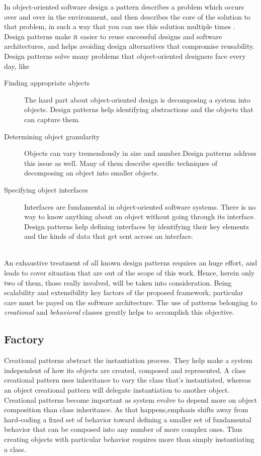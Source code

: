 In object-oriented software design a pattern describes a problem which occurs over and over in the environment, and then describes the core of the solution to that problem, in such a way that you can use this solution multiple times \citep{vlissides1995design}. Design patterns make it easier to reuse successful designs and software architectures, and helps avoiding design alternatives that compromise reusability.
\noindent
\\
Design patterns solve many problems that object-oriented designers face every day, like
\begin{description}
\item[Finding appropriate abjects] The hard part about object-oriented design is decomposing a system into objects. Design patterns help identifying abstractions and the objects that can capture them.
\item[Determining object granularity] Objects can vary tremendously in size and number.Design patterns address this issue as well. Many of them describe specific techniques of decomposing an object into smaller objects.
\item[Specifying object interfaces] Interfaces are fundamental in object-oriented software systems. There is no way to know anything about an object without going through its interface. Design patterns help defining interfaces by identifying their key elements and the kinds of data that get sent across an interface.
\end{description}
\noindent
\\
An exhaustive treatment of all known design patterns requires an huge effort, and leads to cover situation that are out of the scope of this work. Hence, herein only two of them, those really involved, will be taken into consideration. Being scalability and extensibility key factors of the proposed framework, particular care must be payed on the software architecture. The use of patterns belonging to \textit{creational} and \textit{behavioral} classes greatly helps to accomplish this objective. 

\subsection{Factory}

Creational patterns abstract the instantiation process. They help make a system independent of how its objects are created, composed and represented. A class creational pattern uses inheritance to vary the class that's instantiated, whereas an object creational pattern will delegate instantiation to another object. Creational patterns become important as system evolve to depend more on object composition than class inheritance. As that happens,emphasis shifts away from hard-coding a fixed set of behavior toward defining a smaller set of fundamental behavior that can be composed into any number of more complex ones. Thus creating objects with particular behavior requires more than simply instantiating a class.
